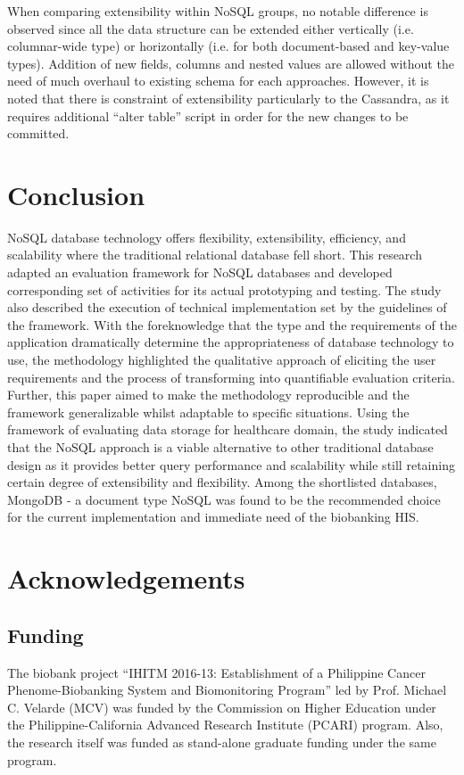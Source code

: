 \documentclass[5p]{elsarticle}
\begin{document}
When comparing extensibility within NoSQL groups, no notable difference is observed since all the data structure can be extended either 
vertically (i.e. columnar-wide type) or horizontally (i.e. for both document-based and key-value types). 
Addition of new fields, columns and nested values are allowed without the need of much overhaul to existing schema for each approaches. 
However, it is noted that there is constraint of extensibility particularly to the Cassandra, as it requires additional 
“alter table” script in order for the new changes to be committed.


\section{Conclusion}
NoSQL database technology offers flexibility, extensibility, efficiency, and scalability where the traditional relational database fell short. 
This research adapted an evaluation framework for NoSQL databases and developed corresponding set of activities for its actual prototyping and testing. 
The study also described the execution of technical implementation set by the guidelines of the framework. With the foreknowledge that the type and 
the requirements of the application dramatically determine the appropriateness of database technology to use, the methodology highlighted the 
qualitative approach of eliciting the user requirements and the process of transforming into quantifiable evaluation criteria. 
Further, this paper aimed to make the methodology reproducible and the framework generalizable whilst adaptable to specific situations. 
Using the framework of evaluating data storage for healthcare domain, the study indicated that the NoSQL approach is a viable alternative to 
other traditional database design as it provides better query performance and scalability while still retaining certain degree of extensibility and flexibility. 
Among the shortlisted databases, MongoDB - a document type NoSQL was found to be the recommended choice for the current implementation and immediate need of the biobanking HIS.

\section*{Acknowledgements}

\subsection*{Funding} The biobank project “IHITM 2016-13: Establishment of a Philippine Cancer 
Phenome-Biobanking System and Biomonitoring Program” led by Prof. Michael C. Velarde (MCV) was funded by the Commission on Higher Education under
the Philippine-California Advanced Research Institute (PCARI) program. Also, the research itself was funded as stand-alone graduate funding under the same program. 
\end{document}
